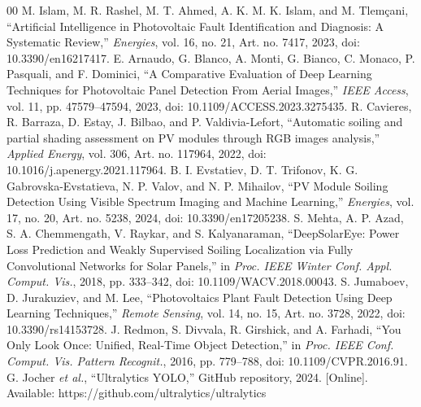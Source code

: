 \documentclass[conference]{IEEEtran}
\begin{document}
\begin{thebibliography}{00}
 M. Islam, M. R. Rashel, M. T. Ahmed, A. K. M. K. Islam, and M. Tlem\c{c}ani, ``Artificial Intelligence in Photovoltaic Fault Identification and Diagnosis: A Systematic Review,'' \textit{Energies}, vol. 16, no. 21, Art. no. 7417, 2023, doi: 10.3390/en16217417.
 E. Arnaudo, G. Blanco, A. Monti, G. Bianco, C. Monaco, P. Pasquali, and F. Dominici, ``A Comparative Evaluation of Deep Learning Techniques for Photovoltaic Panel Detection From Aerial Images,'' \textit{IEEE Access}, vol. 11, pp. 47579--47594, 2023, doi: 10.1109/ACCESS.2023.3275435.
 R. Cavieres, R. Barraza, D. Estay, J. Bilbao, and P. Valdivia-Lefort, ``Automatic soiling and partial shading assessment on PV modules through RGB images analysis,'' \textit{Applied Energy}, vol. 306, Art. no. 117964, 2022, doi: 10.1016/j.apenergy.2021.117964.
 B. I. Evstatiev, D. T. Trifonov, K. G. Gabrovska-Evstatieva, N. P. Valov, and N. P. Mihailov, ``PV Module Soiling Detection Using Visible Spectrum Imaging and Machine Learning,'' \textit{Energies}, vol. 17, no. 20, Art. no. 5238, 2024, doi: 10.3390/en17205238.
 S. Mehta, A. P. Azad, S. A. Chemmengath, V. Raykar, and S. Kalyanaraman, ``DeepSolarEye: Power Loss Prediction and Weakly Supervised Soiling Localization via Fully Convolutional Networks for Solar Panels,'' in \textit{Proc. IEEE Winter Conf. Appl. Comput. Vis.}, 2018, pp. 333--342, doi: 10.1109/WACV.2018.00043.
 S. Jumaboev, D. Jurakuziev, and M. Lee, ``Photovoltaics Plant Fault Detection Using Deep Learning Techniques,'' \textit{Remote Sensing}, vol. 14, no. 15, Art. no. 3728, 2022, doi: 10.3390/rs14153728.
 J. Redmon, S. Divvala, R. Girshick, and A. Farhadi, ``You Only Look Once: Unified, Real-Time Object Detection,'' in \textit{Proc. IEEE Conf. Comput. Vis. Pattern Recognit.}, 2016, pp. 779--788, doi: 10.1109/CVPR.2016.91.
 G. Jocher \textit{et al.}, ``Ultralytics YOLO,'' GitHub repository, 2024. [Online]. Available: https://github.com/ultralytics/ultralytics
\end{thebibliography}
\end{document}
